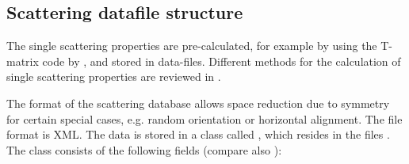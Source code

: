 \subsection{Scattering datafile structure}
 
The single scattering properties are pre-calculated, for example by
using the T-matrix 
code by \citet{Mishchenko:02}, and stored in data-files. Different
methods for the calculation of single scattering properties are
reviewed in \citet{emde05:_phdthesis}. 

The format of the scattering database allows space reduction due to
symmetry for certain special cases, e.g. random orientation or
horizontal alignment. The file format is XML. The data is stored in a
class called , which resides in
the files . The class consists of the
following 
fields (compare also ):

